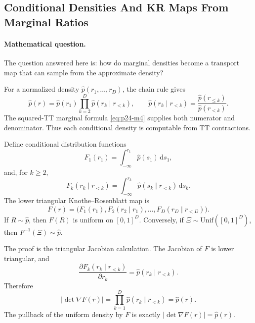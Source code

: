\documentclass[11pt]{article}
\numberwithin{equation}{section}
\newcommand{\dd}{\,\mathrm d}
\begin{document}
\subsection{Conditional Densities And KR Maps From Marginal Ratios}

\paragraph{Mathematical question.}
The question answered here is: how do marginal densities become a transport map
that can sample from the approximate density?

For a normalized density \(\widehat p(r_1,\ldots,r_D)\), the chain rule gives
\begin{equation}
    \widehat p(r)
    =
    \widehat p(r_1)
    \prod_{k=2}^D
    \widehat p(r_k\mid r_{<k}),
    \qquad
    \widehat p(r_k\mid r_{<k})
    =
    \frac{\widehat p(r_{\le k})}{\widehat p(r_{<k})}.
    \label{eq:p24-k1}
\end{equation}
The squared-TT marginal formula \eqref{eq:p24-m4} supplies both numerator and denominator.
Thus each conditional density is computable from TT contractions.

Define conditional distribution functions
\begin{equation}
    F_1(r_1)=\int_{-\infty}^{r_1}\widehat p(s_1)\dd s_1,
    \label{eq:p24-k2}
\end{equation}
and, for \(k\ge2\),
\begin{equation}
    F_k(r_k\mid r_{<k})
    =
    \int_{-\infty}^{r_k}
    \widehat p(s_k\mid r_{<k})\dd s_k.
    \label{eq:p24-k3}
\end{equation}
The lower triangular Knothe--Rosenblatt map is
\begin{equation}
    F(r)
    =
    \bigl(
    F_1(r_1),
    F_2(r_2\mid r_1),
    \ldots,
    F_D(r_D\mid r_{<D})
    \bigr).
    \label{eq:p24-k4}
\end{equation}
If \(R\sim\widehat p\), then \(F(R)\) is uniform on \([0,1]^D\).  Conversely, if
\(\Xi\sim \mathrm{Unif}([0,1]^D)\), then \(F^{-1}(\Xi)\sim\widehat p\).

The proof is the triangular Jacobian calculation.  The Jacobian of \(F\) is
lower triangular, and
\[
    \frac{\partial F_k(r_k\mid r_{<k})}{\partial r_k}
    =
    \widehat p(r_k\mid r_{<k}).
\]
Therefore
\begin{equation}
    |\det\nabla F(r)|
    =
    \prod_{k=1}^D \widehat p(r_k\mid r_{<k})
    =
    \widehat p(r).
    \label{eq:p24-k5}
\end{equation}
The pullback of the uniform density by \(F\) is exactly
\(|\det\nabla F(r)|=\widehat p(r)\).
\end{document}
